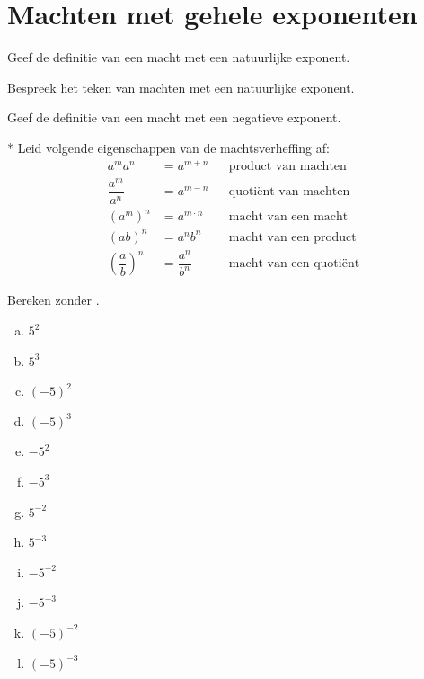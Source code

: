 \documentclass[12pt,twoside]{article}
\begin{document}
\begin{theorie}
  \thispagestyle{empty}
  \mbox{}
  \newpage
  \clearpage
  \thispagestyle{empty}
  \tableofcontents
  \newpage
  \clearpage

  \fancyhead[RE,LO]{}

\end{theorie}

\section{Machten met gehele exponenten}

\begin{oefening}
Geef de definitie van een macht met een natuurlijke exponent.
\end{oefening}

\begin{oefening}
Bespreek het teken van machten met een natuurlijke exponent.
\end{oefening}

\begin{oefening}
Geef de definitie van een macht met een negatieve exponent.
\end{oefening}

\begin{oefening}*
Leid volgende eigenschappen van de machtsverheffing af:
\begin{align*}
  a^m a^n &= a^{m+n} && \mbox{product van machten}\\
  \dfrac{a^m}{a^n} &= a^{m-n} && \mbox{quotiënt van machten}\\
  \left(a^m\right)^n &= a^{m\cdot n} && \mbox{macht van een macht}\\
  \left(ab\right)^n &= a^n b^n && \mbox{macht van een product}\\
  \left(\dfrac{a}{b}\right)^n &= \dfrac{a^n}{b^n} && \mbox{macht van een quotiënt}
\end{align*}
\end{oefening}

\begin{oefening}
Bereken zonder .
\begin{multicols}{4}
  \begin{enumerate}[(a)]
    \itemsep.5em
    \item $5^2$
    \item $5^3$
    \item $(-5)^2$
    \item $(-5)^3$
    \item $-5^2$
    \item $-5^3$
    \item $5^{-2}$
    \item $5^{-3}$
    \item $-5^{-2}$
    \item $-5^{-3}$
    \item $(-5)^{-2}$
    \item $(-5)^{-3}$
  \end{enumerate}
\end{multicols}
\end{oefening}
\end{document}
